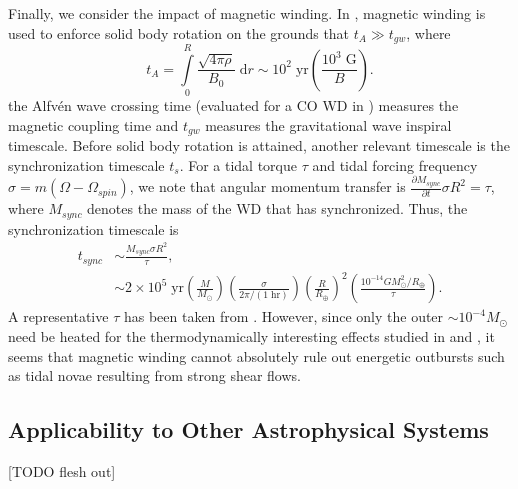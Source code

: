 \documentclass[
        fleqn,
        usenatbib,
    ]{mnras}
\newcommand*{\pd}[2]{\frac{\partial#1}{\partial#2}}
\newcommand*{\p}[1]{\left(#1\right)}
\begin{document}
Finally, we consider the impact of magnetic winding. In \citep{bukart}, magnetic
winding is used to enforce solid body rotation on the grounds that $t_A \gg
t_{gw}$, where
\begin{equation}
    t_A = \int\limits_0^R \frac{\sqrt{4\pi \rho}}{B_0}\;\mathrm{d}r
        \sim 10^2\;\mathrm{yr}\p{\frac{10^3\;\mathrm{G}}{B}}.
\end{equation}
the Alfv\'en wave crossing time (evaluated for a CO WD in \citep{fullerIV})
measures the magnetic coupling time and $t_{gw}$ measures the gravitational wave
inspiral timescale. Before solid body rotation is attained, another relevant
timescale is the synchronization timescale $t_s$. For a tidal torque $\tau$ and
tidal forcing frequency $\sigma = m\p{\Omega - \Omega_{spin}}$, we note that
angular momentum transfer is $\pd{M_{sync}}{t} \sigma R^2 = \tau$, where
$M_{sync}$ denotes the mass of the WD that has synchronized. Thus, the
synchronization timescale is
\begin{align}
    t_{sync} &\sim \frac{M_{sync}\sigma R^2}{\tau},\nonumber\\
        &\sim 2 \times 10^5\;\mathrm{yr}
            \p{\frac{M}{M_{\odot}}}
            \p{\frac{\sigma}{2\pi / (1\;\mathrm{hr})}}
            \p{\frac{R}{R_{\oplus}}}^2
            \p{\frac{10^{-14} GM_{\odot}^2/R_{\oplus}}{\tau}}.
\end{align}
A representative $\tau$ has been taken from \citep{bukart}. However, since only
the outer $\sim 10^{-4}M_{\odot}$ need be heated for the thermodynamically
interesting effects studied in \citep{fullerIV} and \citep{tidal_novae}, it
seems that magnetic winding cannot absolutely rule out energetic outbursts such
as tidal novae resulting from strong shear flows.

\subsection{Applicability to Other Astrophysical Systems}

[TODO flesh out]
\end{document}
